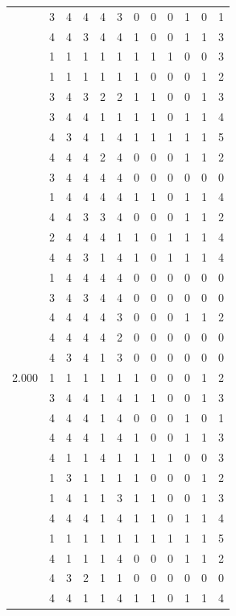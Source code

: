 \documentclass[]{msu-thesis}
\theoremstyle{definition}
\theoremstyle{definition}
\theoremstyle{definition}
\theoremstyle{remark}
\begin{document}
\begin{table}
{\begin{tabular}[t]{rrrrrrrrrrrr}
 & 3 & 4 & 4 & 4 & 3 & 0 & 0 & 0 & 1 & 0 & 1\\
 & 4 & 4 & 3 & 4 & 4 & 1 & 0 & 0 & 1 & 1 & 3\\
 & 1 & 1 & 1 & 1 & 1 & 1 & 1 & 1 & 0 & 0 & 3\\
 & 1 & 1 & 1 & 1 & 1 & 1 & 0 & 0 & 0 & 1 & 2\\
 & 3 & 4 & 3 & 2 & 2 & 1 & 1 & 0 & 0 & 1 & 3\\
 & 3 & 4 & 4 & 1 & 1 & 1 & 1 & 0 & 1 & 1 & 4\\
 & 4 & 3 & 4 & 1 & 4 & 1 & 1 & 1 & 1 & 1 & 5\\
 & 4 & 4 & 4 & 2 & 4 & 0 & 0 & 0 & 1 & 1 & 2\\
 & 3 & 4 & 4 & 4 & 4 & 0 & 0 & 0 & 0 & 0 & 0\\
 & 1 & 4 & 4 & 4 & 4 & 1 & 1 & 0 & 1 & 1 & 4\\
 & 4 & 4 & 3 & 3 & 4 & 0 & 0 & 0 & 1 & 1 & 2\\
 & 2 & 4 & 4 & 4 & 1 & 1 & 0 & 1 & 1 & 1 & 4\\
 & 4 & 4 & 3 & 1 & 4 & 1 & 0 & 1 & 1 & 1 & 4\\
 & 1 & 4 & 4 & 4 & 4 & 0 & 0 & 0 & 0 & 0 & 0\\
 & 3 & 4 & 3 & 4 & 4 & 0 & 0 & 0 & 0 & 0 & 0\\
 & 4 & 4 & 4 & 4 & 3 & 0 & 0 & 0 & 1 & 1 & 2\\
 & 4 & 4 & 4 & 4 & 2 & 0 & 0 & 0 & 0 & 0 & 0\\
 & 4 & 3 & 4 & 1 & 3 & 0 & 0 & 0 & 0 & 0 & 0\\
2.000 & 1 & 1 & 1 & 1 & 1 & 1 & 0 & 0 & 0 & 1 & 2\\
 & 3 & 4 & 4 & 1 & 4 & 1 & 1 & 0 & 0 & 1 & 3\\
 & 4 & 4 & 4 & 1 & 4 & 0 & 0 & 0 & 1 & 0 & 1\\
 & 4 & 4 & 4 & 1 & 4 & 1 & 0 & 0 & 1 & 1 & 3\\
 & 4 & 1 & 1 & 4 & 1 & 1 & 1 & 1 & 0 & 0 & 3\\
 & 1 & 3 & 1 & 1 & 1 & 1 & 0 & 0 & 0 & 1 & 2\\
 & 1 & 4 & 1 & 1 & 3 & 1 & 1 & 0 & 0 & 1 & 3\\
 & 4 & 4 & 4 & 1 & 4 & 1 & 1 & 0 & 1 & 1 & 4\\
 & 1 & 1 & 1 & 1 & 1 & 1 & 1 & 1 & 1 & 1 & 5\\
 & 4 & 1 & 1 & 1 & 4 & 0 & 0 & 0 & 1 & 1 & 2\\
 & 4 & 3 & 2 & 1 & 1 & 0 & 0 & 0 & 0 & 0 & 0\\
 & 4 & 4 & 1 & 1 & 4 & 1 & 1 & 0 & 1 & 1 & 4\\

\end{tabular}}
\end{table}
\end{document}
